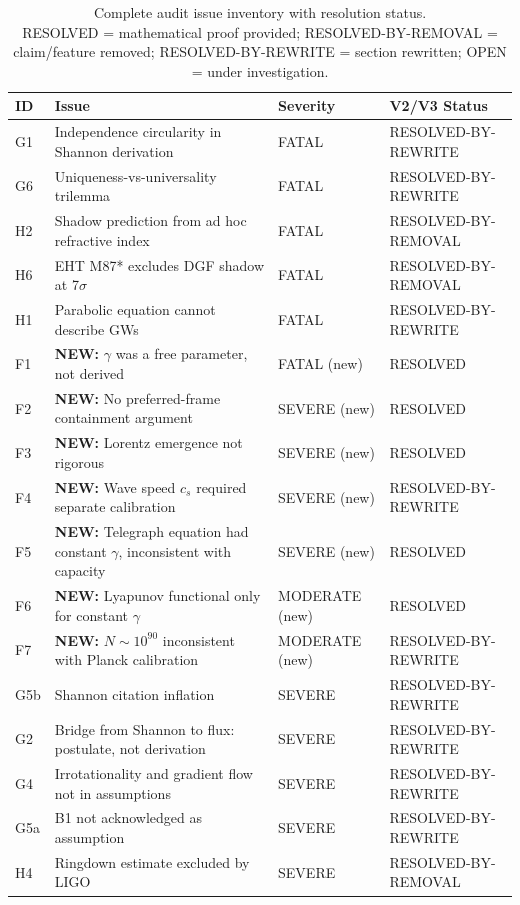 \documentclass[reprint]{revtex4-2}
\begin{document}
\begin{table}[h]
\caption{Complete audit issue inventory with resolution status.\\
RESOLVED = mathematical proof provided; RESOLVED-BY-REMOVAL = claim/feature removed; RESOLVED-BY-REWRITE = section rewritten; OPEN = under investigation.}
\begin{tabular}{p{0.5cm}p{5.5cm}ll}
\toprule
ID & Issue & Severity & V2/V3 Status \\
\midrule
G1 & Independence circularity in Shannon derivation & FATAL & RESOLVED-BY-REWRITE \\
G6 & Uniqueness-vs-universality trilemma & FATAL & RESOLVED-BY-REWRITE \\
H2 & Shadow prediction from ad hoc refractive index & FATAL & RESOLVED-BY-REMOVAL \\
H6 & EHT M87* excludes DGF shadow at 7$\sigma$ & FATAL & RESOLVED-BY-REMOVAL \\
H1 & Parabolic equation cannot describe GWs & FATAL & RESOLVED-BY-REWRITE \\
F1 & \textbf{NEW:} $\gamma$ was a free parameter, not derived & FATAL (new) & RESOLVED \\
F2 & \textbf{NEW:} No preferred-frame containment argument & SEVERE (new) & RESOLVED \\
F3 & \textbf{NEW:} Lorentz emergence not rigorous & SEVERE (new) & RESOLVED \\
F4 & \textbf{NEW:} Wave speed $c_s$ required separate calibration & SEVERE (new) & RESOLVED-BY-REWRITE \\
F5 & \textbf{NEW:} Telegraph equation had constant $\gamma$, inconsistent with capacity & SEVERE (new) & RESOLVED \\
F6 & \textbf{NEW:} Lyapunov functional only for constant $\gamma$ & MODERATE (new) & RESOLVED \\
F7 & \textbf{NEW:} $N\sim 10^{90}$ inconsistent with Planck calibration & MODERATE (new) & RESOLVED-BY-REWRITE \\
G5b & Shannon citation inflation & SEVERE & RESOLVED-BY-REWRITE \\
G2 & Bridge from Shannon to flux: postulate, not derivation & SEVERE & RESOLVED-BY-REWRITE \\
G4 & Irrotationality and gradient flow not in assumptions & SEVERE & RESOLVED-BY-REWRITE \\
G5a & B1 not acknowledged as assumption & SEVERE & RESOLVED-BY-REWRITE \\
H4 & Ringdown estimate excluded by LIGO & SEVERE & RESOLVED-BY-REMOVAL \\

\end{tabular}
\end{table}
\end{document}
